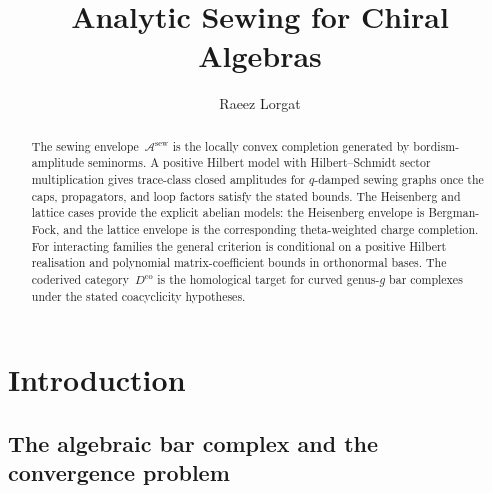 \documentclass[11pt,reqno]{amsart}
\theoremstyle{definition}
\theoremstyle{remark}
\newcommand{\cA}{\mathcal{A}}
\newcommand{\Dco}{D^{\mathrm{co}}}
\numberwithin{equation}{section}
\begin{document}
\title[Analytic Sewing for Chiral Algebras]
{Analytic Sewing for Chiral Algebras}

\author{Raeez Lorgat}
\address{Perimeter Institute for Theoretical Physics,
 Waterloo, ON N2L 2Y5, Canada\newline
 Department of Physics \& Astronomy, University of Waterloo,
 Waterloo, ON N2L 3G1, Canada}

\date{}

\begin{abstract}
The sewing envelope~$\cA^{\mathrm{sew}}$ is the locally convex
completion generated by bordism-amplitude seminorms. A positive
Hilbert model with Hilbert--Schmidt sector multiplication gives
trace-class closed amplitudes for $q$-damped sewing graphs once the
caps, propagators, and loop factors satisfy the stated bounds. The
Heisenberg and lattice cases provide the explicit abelian models:
the Heisenberg envelope is Bergman-Fock, and the lattice envelope is
the corresponding theta-weighted charge completion. For interacting
families the general criterion is conditional on a positive Hilbert
realisation and polynomial matrix-coefficient bounds in orthonormal
bases. The coderived category~$\Dco$ is the homological target for
curved genus-$g$ bar complexes under the stated coacyclicity
hypotheses.
\end{abstract}



\maketitle

\setcounter{tocdepth}{2}
\tableofcontents


\section{Introduction}\label{sec:intro}

\subsection{The algebraic bar complex and the convergence
 problem}\label{subsec:problem}
\end{document}

